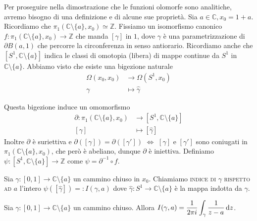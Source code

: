 Per proseguire nella dimostrazione che le funzioni olomorfe sono analitiche, avremo bisogno di una definizione e di alcune sue proprietà. Sia $a \in \mathbb{C}, x_0=1+a$. Ricordiamo che $\pi_1(\mathbb{C}\setminus\{a\}, x_0) \simeq \mathbb{Z}$. Fissiamo un isomorfismo canonico $f:\pi_1(\mathbb{C}\setminus\{a\}, x_0)\longrightarrow \mathbb{Z}$ che manda $[\gamma]$ in $1$, dove $\gamma$ è una parametrizzazione di $\partial B(a, 1)$ che percorre la circonferenza in senso antiorario.
Ricordiamo anche che $[S^1, \mathbb{C}\setminus\{a\}]$ indica le classi di omotopia (libera) di mappe continue da $S^1$ in $\mathbb{C}\setminus\{a\}$. Abbiamo visto che esiste una bigezione naturale
\begin{align*}
  \Omega(x_0, x_0) &\longrightarrow \Omega(S^1, x_0)\\
  \gamma &\longmapsto \hat{\gamma}
\end{align*}
\begin{center}
\end{center}
Questa bigezione induce un omomorfismo
\begin{align*}
  \partial:\pi_1(\mathbb{C}\setminus\{a\}, x_0) &\longrightarrow [S^1, \mathbb{C}\setminus\{a\}]\\
  [\gamma] &\longmapsto [\hat{\gamma}]
\end{align*}
Inoltre $\partial$ è suriettiva e $\partial([\gamma])=\partial([\gamma'])$ $\iff$ $[\gamma]$ e $[\gamma']$ sono coniugati in $\pi_1(\mathbb{C}\setminus\{a\}, x_0)$, che però è abeliano, dunque $\partial$ è iniettiva.
Definiamo $\psi:[S^1, \mathbb{C}\setminus\{a\}] \longrightarrow \mathbb{Z}$ come $\psi=\partial^{-1}\circ f$.

\begin{defn}
  Sia $\gamma:[0,1] \longrightarrow \mathbb{C}\setminus\{a\}$ un cammino chiuso in $x_0$. Chiamiamo \textsc{indice di $\gamma$ rispetto ad $a$} l'intero $\psi([\hat{\gamma}])=:I(\gamma, a)$ dove $\hat{\gamma}:S^1 \longrightarrow \mathbb{C}\setminus\{a\}$ è la mappa indotta da $\gamma$.
\end{defn}

\begin{thm}
  Sia $\gamma:[0,1] \longrightarrow \mathbb{C}\setminus\{a\}$ un cammino chiuso. Allora $\displaystyle I(\gamma, a)=\frac{1}{2\pi i}\int_{\gamma} \frac{1}{z-a}\mathop{}\!\mathrm{d} z$.
\end{thm}

